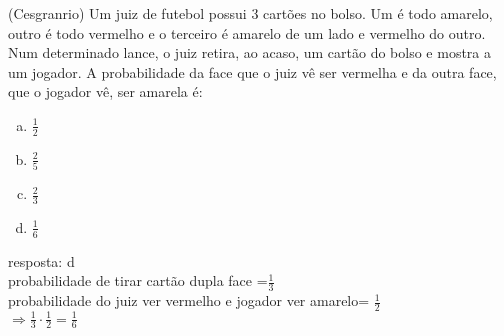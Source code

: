 \begin{ex}
 	(Cesgranrio) Um juiz de futebol possui 3 cartões no bolso. Um é todo amarelo, outro é todo vermelho e o terceiro é amarelo de um lado e vermelho do outro. Num determinado lance, o juiz retira, ao acaso, um cartão do bolso e mostra a um jogador.
A probabilidade da face que o juiz vê ser vermelha e da outra face, que o jogador vê, ser amarela é:
    \begin{enumerate}[(a)]
    \item $\frac{1}{2}$
    \item $\frac{2}{5}$
    \item $\frac{2}{3}$
    \item $\frac{1}{6}$
    \end{enumerate}
      \begin{sol}
       resposta: d  \\
       probabilidade de tirar cartão dupla face =$\frac{1}{3}$ \\
       probabilidade do juiz ver vermelho e jogador ver amarelo= $\frac{1}{2}$\\
       $\Longrightarrow \frac{1}{3}\cdot\frac{1}{2}=\frac{1}{6}$
      \end{sol}
\end{ex}
